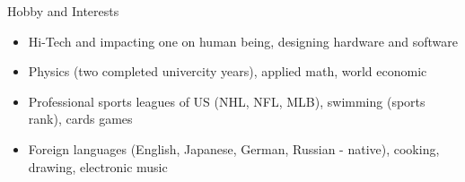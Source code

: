 \documentclass{resume}
\begin{document}
\begin{rSection}{Hobby and Interests}

\begin{itemize}
\item Hi-Tech and impacting one on human being, designing hardware and software
\item Physics (two completed univercity years), applied math, world economic
\item Professional sports leagues of US (NHL, NFL, MLB), swimming (sports rank), cards games
\item Foreign languages (English, Japanese, German, Russian - native), cooking, drawing, electronic music
\end{itemize}

\end{rSection}

\end{document}
